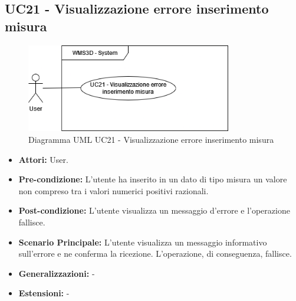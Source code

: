 \subsection{UC21 - Visualizzazione errore inserimento misura}
\begin{figure}[H]
  \centering
  \includegraphics[width=0.8\textwidth]{UC_diagrams_21-26/UC21.drawio.png}
   \caption{Diagramma UML UC21 - Visualizzazione errore inserimento misura}
\end{figure}
\begin{itemize}
    \item \textbf{Attori:} User.
    \item \textbf{Pre-condizione:}  L'utente ha inserito in un dato di tipo misura un valore non compreso tra i valori numerici positivi razionali.
    \item \textbf{Post-condizione:} L'utente visualizza un messaggio d'errore e l'operazione fallisce.
    \item \textbf{Scenario Principale:}  L'utente visualizza un messaggio informativo sull'errore e ne conferma la ricezione. L'operazione, di conseguenza, fallisce.
    \item \textbf{Generalizzazioni:} -
    \item \textbf{Estensioni:} -
\end{itemize}